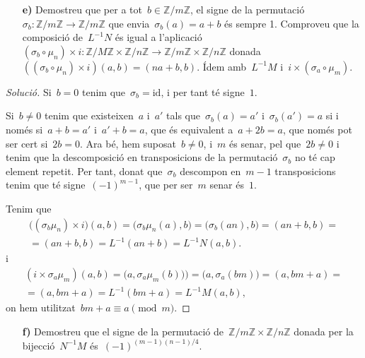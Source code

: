 \documentclass[a4paper]{article}
\newcommand{\ZZ}{\mathbb{Z}}
\newcommand{\id}{\mathrm{id}}
\newenvironment{solution}{
    \renewcommand\qedsymbol{\ensuremath{\lozenge}}
    \begin{proof}[Solució]
        }{
    \end{proof}
}
\begin{document}
\begin{enumerate}
    \item[\textbf{e)}] Demostreu que per a tot~\(b\in\ZZ/m\ZZ\), el signe de la
        permutació~\(\sigma_{b}:\ZZ/m\ZZ\rightarrow\ZZ/m\ZZ\) que
        envia~\(\sigma_{b}(a)=a+b\) és sempre 1.
        Comproveu que la composició de~\(L^{-1}N\) és igual a
        l'aplicació~\((\sigma_{b}\circ\mu_{n})\times
        i:\ZZ/M\ZZ\times\ZZ/n\ZZ\rightarrow\ZZ/m\ZZ\times\ZZ/n\ZZ\)
        donada~\(((\sigma_{b}\circ\mu_{n})\times i)(a,b)=(na+b,b)\).
        Ídem amb~\(L^{-1}M\) i~\(i\times(\sigma_{a}\circ\mu_{m})\).
\end{enumerate}

\begin{solution}
    Si~\(b=0\) tenim que~\(\sigma_{b}=\id\), i per tant té signe~\(1\).

    Si~\(b\neq0\) tenim que existeixen~\(a\) i~\(a'\) tals
    que~\(\sigma_{b}(a)=a'\) i~\(\sigma_{b}(a')=a\) si i només si~\(a+b=a'\)
    i~\(a'+b=a\), que és equivalent a~\(a+2b=a\), que només pot ser cert
    si~\(2b=0\). Ara bé, hem suposat~\(b\neq0\), i~\(m\) és senar, pel
    que~\(2b\neq0\) i tenim que la descomposició en transposicions de la
    permutació~\(\sigma_{b}\) no té cap element repetit. Per tant, donat
    que~\(\sigma_{b}\) descompon en~\(m-1\) transposicions tenim que té
    signe~\((-1)^{m-1}\), que per ser~\(m\) senar és~\(1\).

    Tenim que
    \begin{multline*}
        \bigl((\sigma_{b}\mu_{n})\times i\bigr)(a,b)
        =
        \bigl(\sigma_{b}\mu_{n}(a),b\bigr)
        =
        \bigl(\sigma_{b}(an),b\bigr)
        =
        (an+b,b)
        = \\ =
        (an+b,b)
        =
        L^{-1}(an+b)
        =
        L^{-1}N(a,b).
    \end{multline*}
    i
    \begin{multline*}
        (i\times\sigma_{a}\mu_{m})(a,b)
        =
        \bigl(a,\sigma_{a}\mu_{m}(b))\bigr)
        =
        \bigl(a,\sigma_{a}(bm)\bigr)
        =
        (a,bm+a)
        = \\ =
        (a,bm+a)
        =
        L^{-1}(bm+a)
        =
        L^{-1}M(a,b),
    \end{multline*}
    on hem utilitzat~\(bm+a\equiv a\pmod{m}\).
\end{solution}

\begin{enumerate}
    \item[\textbf{f)}] Demostreu que el signe de la permutació
        de~\(\ZZ/m\ZZ\times\ZZ/n\ZZ\) donada per la bijecció~\(N^{-1}M\)
        és~\((-1)^{(m-1)(n-1)/4}\).
\end{enumerate}
\end{document}
